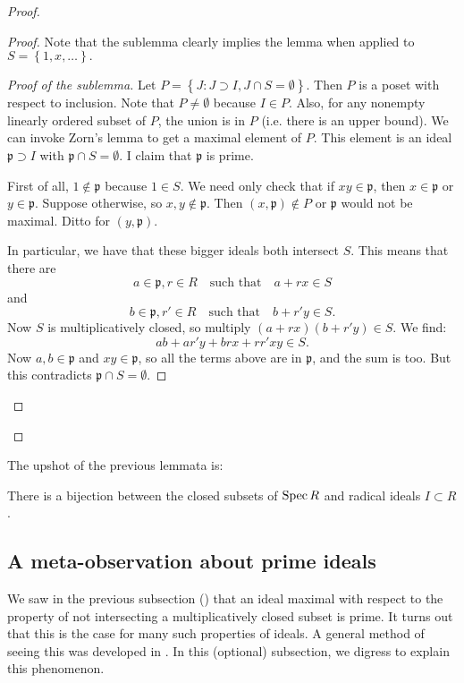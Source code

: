 \begin{proof}
\begin{proof}
Note that the sublemma clearly implies the lemma when applied to
$S =
\left\{1, x, \dots\right\}.$

\begin{proof}[Proof of the sublemma]
Let $P = \left\{J: J \supset I, J \cap S = \emptyset \right\}$.
Then $P$ is a
poset with respect to inclusion. Note that $P \neq \emptyset$
because $I \in P$. Also,
for any nonempty linearly ordered subset of $P$, the union is in
$P$ (i.e. there is an
upper bound).  
We can invoke Zorn's lemma to get a maximal element of $P$. This
element is an
ideal $\mathfrak{p} \supset I$ with $\mathfrak{p} \cap S =
\emptyset$. I claim
that $\mathfrak{p}$ is prime.

First of all, $1 \notin \mathfrak{p}$ because $1 \in S$. We need
only check
that if $xy \in \mathfrak{p}$, then $x \in \mathfrak{p}$ or $y
\in
\mathfrak{p}$. Suppose otherwise, so $x,y \notin \mathfrak{p}$.
Then $(x,\mathfrak{p}) \notin P$ or
$\mathfrak{p}$ would not be maximal. Ditto for $(y,
\mathfrak{p})$.

In particular, we have that these bigger ideals both intersect
$S$. This means
that there are 
\[ a \in \mathfrak{p} , r \in R \quad \text{such that}\quad a+rx
\in S \]
and 
\[ b \in \mathfrak{p} , r' \in R \quad \text{such that}\quad
b+r'y \in S .\]
Now $S$ is multiplicatively closed, so multiply $(a+rx)(b+r'y)
\in S$.
We find:
\[ ab + ar'y+brx+rr'xy \in S.  \]
Now $a,b \in \mathfrak{p}$ and $xy \in \mathfrak{p}$, so all the
terms above are in $\mathfrak{p}$, and the sum is too. But this contradicts
$\mathfrak{p}
\cap S = \emptyset$. 
\end{proof}
\end{proof} 
\end{proof} 
The upshot of the previous lemmata is:
\begin{proposition}
There is a bijection between the closed subsets of $\operatorname{Spec} R$ and
radical ideals
$I \subset R$.
\end{proposition}

\subsection{A meta-observation about prime ideals}

We saw in the previous subsection ()
that an ideal maximal with respect to the property of not intersecting a
multiplicatively closed subset is prime.
It turns out that this is the case for many such properties of ideals.
A general method of seeing this was developed in \cite{LaRe08}.
In this (optional) subsection, we digress to explain this phenomenon.

